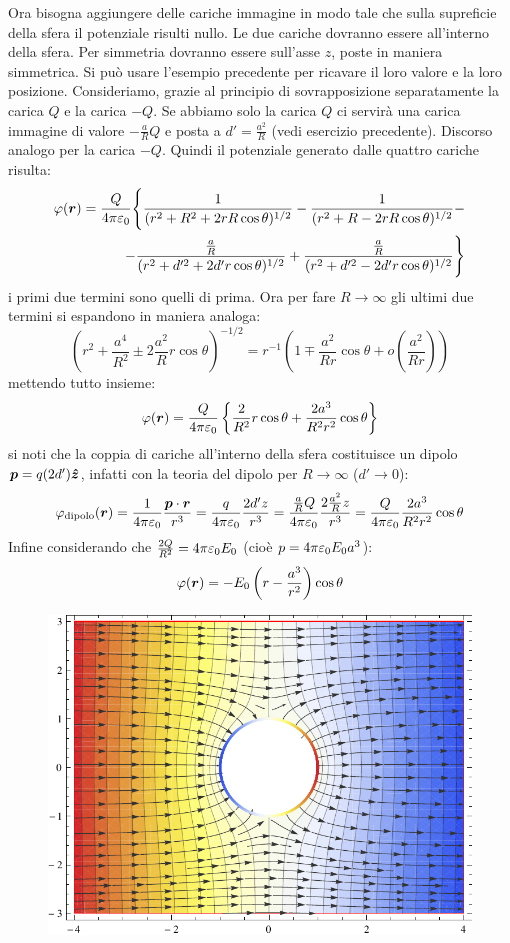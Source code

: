 \begin{Es}
  Ora bisogna aggiungere delle cariche immagine in modo tale che sulla supreficie della sfera il potenziale risulti nullo. Le due cariche dovranno essere all'interno della sfera. Per simmetria dovranno essere sull'asse $z$, poste in maniera simmetrica. Si può usare l'esempio precedente per ricavare il loro valore e la loro posizione. Consideriamo, grazie al principio di sovrapposizione separatamente la carica $Q$ e la carica $-Q$. Se abbiamo solo la carica $Q$ ci servirà una carica immagine di valore $-\frac{a}{R}Q$ e posta a $d'=\frac{a^2}{R}$ (vedi esercizio precedente). Discorso analogo per la carica $-Q$. Quindi il potenziale generato dalle quattro cariche risulta:
  \[
    \begin{aligned}
      \varphi(\boldsymbol{r})=\frac{Q}{4\pi\varepsilon_0}\Biggl\{\frac{1}{(r^2+R^2+2rR\cos\theta)^{1/2}}-\frac{1}{(r^2+R-2rR\cos\theta)^{1/2}}- \\
      -\frac{\frac{a}{R}}{(r^2+d'^2+2d' r\cos\theta)^{1/2}}+\frac{\frac{a}{R}}{(r^2+d'^2-2d' r\cos\theta)^{1/2}}\Biggr\}
    \end{aligned}
  \]
  i primi due termini sono quelli di prima. Ora per fare $R\to\infty$ gli ultimi due termini si espandono in maniera analoga:
  \[
    \left(r^2+\frac{a^4}{R^2}\pm 2\frac{a^2}{R}r\cos\theta\right)^{-1/2} = r^{-1}\left(1\mp\frac{a^2}{Rr}\cos\theta+o\left(\frac{a^2}{Rr}\right)\right)
  \]
  mettendo tutto insieme:
  \[
    \varphi(\boldsymbol{r}) = \frac{Q}{4\pi\varepsilon_0}\left\{\frac{2}{R^2}r\cos\theta+\frac{2a^3}{R^2r^2}\cos\theta\right\}
  \]
  si noti che la coppia di cariche all'interno della sfera costituisce un dipolo $\boldsymbol{p} = q(2d')\boldsymbol{\hat {z}}$, infatti con la teoria del dipolo per $R\to\infty$ ($d'\to 0$):
  \[
    \varphi_\text{dipolo}(\boldsymbol{r}) = \frac{1}{4\pi\varepsilon_0}\frac{\boldsymbol{p}\cdot\boldsymbol{r}}{r^3} = \frac{q}{4\pi\varepsilon_0}\frac{2d'z}{r^3} = \frac{\frac{a}{R}Q}{4\pi\varepsilon_0}\frac{2\frac{a^2}{R}z}{r^3}=\frac{Q}{4\pi\varepsilon_0}\frac{2a^3}{R^2r^2}\cos\theta
  \]
  Infine considerando che $\frac{2Q}{R^2} = 4\pi\varepsilon_0 E_0$ (cioè $p=4\pi\varepsilon_0 E_0 a^3$):
  \[
    \varphi(\boldsymbol{r})=-E_0\left(r-\frac{a^3}{r^2}\right)\cos\theta
  \]
  \begin{figure}[htbp]
    \centering
    \includegraphics[scale=1]{immagini/fisica2/campo_con_sfera}

\end{figure}
\end{Es}
